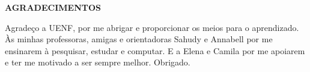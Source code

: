 \begin{titlepage}
\begin{center}
\textbf{AGRADECIMENTOS} \\ [2.5cm]
\end{center}
Agradeço a UENF, por me abrigar e proporcionar os meios para o aprendizado. Às minhas professoras, amigas e orientadoras Sahudy e Annabell por me ensinarem à pesquisar, estudar e computar. E a Elena e Camila por me apoiarem e ter me motivado a ser sempre melhor. Obrigado.
\end{titlepage}



